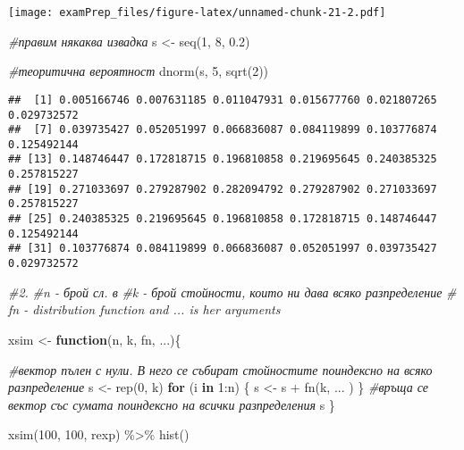 \documentclass[
]{article}
\newenvironment{Shaded}{\begin{snugshade}}{\end{snugshade}}
\newcommand{\CommentTok}[1]{\textcolor[rgb]{0.56,0.35,0.01}{\textit{#1}}}
\newcommand{\ControlFlowTok}[1]{\textcolor[rgb]{0.13,0.29,0.53}{\textbf{#1}}}
\newcommand{\DecValTok}[1]{\textcolor[rgb]{0.00,0.00,0.81}{#1}}
\newcommand{\FloatTok}[1]{\textcolor[rgb]{0.00,0.00,0.81}{#1}}
\newcommand{\FunctionTok}[1]{\textcolor[rgb]{0.00,0.00,0.00}{#1}}
\newcommand{\NormalTok}[1]{#1}
\newcommand{\OtherTok}[1]{\textcolor[rgb]{0.56,0.35,0.01}{#1}}
\newcommand{\SpecialCharTok}[1]{\textcolor[rgb]{0.00,0.00,0.00}{#1}}
\begin{document}
\texttt{[image: examPrep\_files/figure-latex/unnamed-chunk-21-2.pdf]}

\begin{Shaded}
\begin{Highlighting}[]
\CommentTok{\#правим някаква извадка}
\NormalTok{  s }\OtherTok{\textless{}{-}} \FunctionTok{seq}\NormalTok{(}\DecValTok{1}\NormalTok{, }\DecValTok{8}\NormalTok{, }\FloatTok{0.2}\NormalTok{)}
  
\CommentTok{\#теоритична вероятност  }
\FunctionTok{dnorm}\NormalTok{(s, }\DecValTok{5}\NormalTok{, }\FunctionTok{sqrt}\NormalTok{(}\DecValTok{2}\NormalTok{))}
\end{Highlighting}
\end{Shaded}

\begin{verbatim}
##  [1] 0.005166746 0.007631185 0.011047931 0.015677760 0.021807265 0.029732572
##  [7] 0.039735427 0.052051997 0.066836087 0.084119899 0.103776874 0.125492144
## [13] 0.148746447 0.172818715 0.196810858 0.219695645 0.240385325 0.257815227
## [19] 0.271033697 0.279287902 0.282094792 0.279287902 0.271033697 0.257815227
## [25] 0.240385325 0.219695645 0.196810858 0.172818715 0.148746447 0.125492144
## [31] 0.103776874 0.084119899 0.066836087 0.052051997 0.039735427 0.029732572
\end{verbatim}

\begin{Shaded}
\begin{Highlighting}[]
\CommentTok{\#2.}
\CommentTok{\#n {-} брой сл. в}
\CommentTok{\#k {-} брой стойности, които ни дава всяко разпределение}
\CommentTok{\# fn {-} distribution function and ... is her arguments}

\NormalTok{xsim }\OtherTok{\textless{}{-}} \ControlFlowTok{function}\NormalTok{(n, k, fn, ...)\{}
  
  \CommentTok{\#вектор пълен с нули. В него се събират стойностите поиндексно на всяко разпределение}
\NormalTok{  s }\OtherTok{\textless{}{-}} \FunctionTok{rep}\NormalTok{(}\DecValTok{0}\NormalTok{, k)}
  \ControlFlowTok{for}\NormalTok{ (i }\ControlFlowTok{in} \DecValTok{1}\SpecialCharTok{:}\NormalTok{n) \{}
\NormalTok{    s }\OtherTok{\textless{}{-}}\NormalTok{ s }\SpecialCharTok{+} \FunctionTok{fn}\NormalTok{(k, ... )}
\NormalTok{  \}}
  \CommentTok{\#връща се вектор със сумата поиндексно на всички разпределения}
\NormalTok{  s}
\NormalTok{\}}

\FunctionTok{xsim}\NormalTok{(}\DecValTok{100}\NormalTok{, }\DecValTok{100}\NormalTok{, rexp) }\SpecialCharTok{\%\textgreater{}\%} \FunctionTok{hist}\NormalTok{()}
\end{Highlighting}
\end{Shaded}
\end{document}
